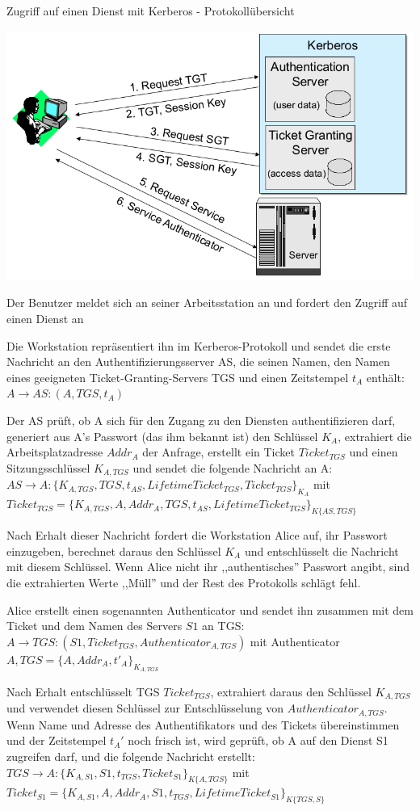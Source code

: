 \documentclass[a4paper]{article}
\begin{document}
\begin{multicols}{3}
      Zugriff auf einen Dienst mit Kerberos - Protokollübersicht
      \begin{center}
            \includegraphics[width=.5\linewidth]{Assets/NetworkSecurity-Kerberos.png}
      \end{center}
      \begin{itemize*}
            \item Der Benutzer meldet sich an seiner Arbeitsstation an und fordert den Zugriff auf einen Dienst an
            \item Die Workstation repräsentiert ihn im Kerberos-Protokoll und sendet die erste Nachricht an den Authentifizierungsserver AS, die seinen Namen, den Namen eines geeigneten Ticket-Granting-Servers TGS und einen Zeitstempel $t_A$ enthält:  $A\rightarrow AS:(A, TGS, t_A)$
            \item Der AS prüft, ob A sich für den Zugang zu den Diensten authentifizieren darf, generiert aus A's Passwort (das ihm bekannt ist) den Schlüssel $K_A$, extrahiert die Arbeitsplatzadresse $Addr_A$ der Anfrage, erstellt ein Ticket $Ticket_{TGS}$ und einen Sitzungsschlüssel $K_{A,TGS}$ und sendet die folgende Nachricht an A: $AS\rightarrow A:\{K_{A,TGS}, TGS, t_{AS}, LifetimeTicket_{TGS}, Ticket_{TGS}\}_{K_A}$ mit $Ticket_{TGS}=\{K_{A,TGS},A, Addr_A, TGS, t_{AS}, LifetimeTicket_{TGS}\}_{K\{AS,TGS\}}$
            \item Nach Erhalt dieser Nachricht fordert die Workstation Alice auf, ihr Passwort einzugeben, berechnet daraus den Schlüssel $K_A$ und entschlüsselt die Nachricht mit diesem Schlüssel. Wenn Alice nicht ihr ,,authentisches'' Passwort angibt, sind die extrahierten Werte ,,Müll'' und der Rest des Protokolls schlägt fehl.
            \item Alice erstellt einen sogenannten Authenticator und sendet ihn zusammen mit dem Ticket und dem Namen des Servers $S1$ an TGS: $A\rightarrow TGS:(S1, Ticket_{TGS}, Authenticator_{A,TGS})$ mit Authenticator $A,TGS=\{A,Addr_A,t'_{A}\}_{K_{A,TGS}}$
            \item Nach Erhalt entschlüsselt TGS $Ticket_{TGS}$, extrahiert daraus den Schlüssel $K_{A,TGS}$ und verwendet diesen Schlüssel zur Entschlüsselung von $Authenticator_{A,TGS}$. Wenn Name und Adresse des Authentifikators und des Tickets übereinstimmen und der Zeitstempel $t_A'$ noch frisch ist, wird geprüft, ob A auf den Dienst S1 zugreifen darf, und die folgende Nachricht erstellt: $TGS\rightarrow A:\{K_{A,S1}, S1, t_{TGS}, Ticket_{S1}\}_{K\{A,TGS\}}$ mit $Ticket_{S1}=\{K_{A,S1}, A, Addr_A, S1, t_{TGS}, LifetimeTicket_{S1}\}_{K\{TGS,S\}}$

\end{itemize*}
\end{multicols}
\end{document}

